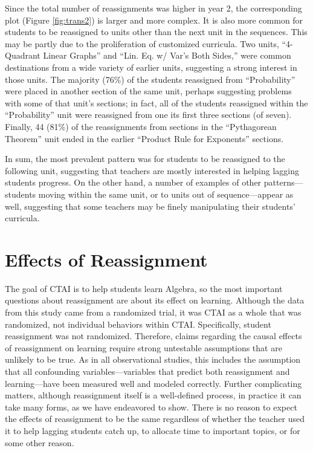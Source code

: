 \documentclass[12pt]{article}\usepackage[]{graphicx}\usepackage[]{color}
\begin{document}
Since the total number of reassignments was higher in year 2, the corresponding plot (Figure \ref{fig:trans2}) is larger and more complex.
It is also more common for students to be reassigned to units other than the next unit in the sequences.
This may be partly due to the proliferation of customized curricula.
Two units, ``4-Quadrant Linear Graphs'' and ``Lin. Eq. w/ Var's Both Sides,'' were common destinations from a wide variety of earlier units, suggesting a strong interest in those units.
The majority (76\%)
of the students reassigned from ``Probability'' were placed in another section of the same unit, perhaps suggesting problems with some of that unit's sections; in fact, all of the students reassigned within the ``Probability'' unit were reassigned from one its first three sections (of seven).
Finally, 44
(81\%) of the reassignments from sections in the ``Pythagorean Theorem'' unit ended in the earlier ``Product Rule for Exponents'' sections.

In sum, the most prevalent pattern was for students to be reassigned to the following unit, suggesting that teachers are mostly interested in helping lagging students progress.
On the other hand, a number of examples of other patterns---students moving within the same unit, or to units out of sequence---appear as well, suggesting that some teachers may be finely manipulating their students' curricula.



\section{Effects of Reassignment}\label{sec:effects}
The goal of CTAI is to help students learn Algebra, so
the most important questions about reassignment are about its effect on learning.
Although the data from this study came from a randomized trial, it was
CTAI as a whole that was randomized, not individual behaviors within CTAI.
Specifically, student reassignment was not randomized.
Therefore, claims regarding the causal effects of reassignment on
learning require strong untestable assumptions that are unlikely to be
true.
As in all observational studies, this includes the assumption that all
confounding variables---variables that predict both reassignment and
learning---have been measured well and modeled correctly.
Further complicating matters, although reassignment itself is a
well-defined process, in practice it can take many forms, as we have
endeavored to show.
There is no reason to expect the effects of reassignment to be
the same regardless of whether the teacher used it to help lagging
students catch up, to allocate time to important topics, or for some
other reason.
\end{document}
